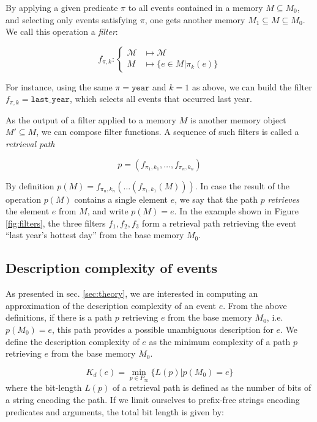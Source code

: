 \documentclass[entropy,article,submit,moreauthors,pdftex]{Definitions/mdpi}
\begin{document}
By applying a given predicate $\pi$ to all events contained in a memory $M \subseteq M_0$, and selecting only events satisfying $\pi$, one gets another memory $M_1 \subseteq M \subseteq M_0$. We call this operation a \emph{filter}:

\begin{equation}
    \label{eq:filter}
    f_{\pi, k}: \begin{cases}
        \mathcal{M} & \mapsto \mathcal{M}           \\
        M           & \mapsto \{e \in M | \pi_k(e) \}
    \end{cases}
\end{equation}

For instance, using the same $\pi = \mathtt{year}$ and $k=1$ as above, we can
build the filter $f_{\pi, k} = \mathtt{last\_{}year}$, which selects all events
that occurred last year.

As the output of a filter applied to a memory $M$ is another memory
object $M' \subseteq M$, we can compose filter
functions. A sequence of such filters is called a \emph{retrieval path}

\begin{equation}
    \label{eq:ret_def}
    p = (f_{\pi_{1}, k_{1}}, \dots, f_{\pi_{n}, k_{n}})
\end{equation}

By definition
$p(M) = f_{\pi_{n}, k_{n}}(\dots(f_{\pi_{1}, k_{1}}(M)))$.
In case the result of the operation $p(M)$ contains a single element
$e$, we say that the path $p$ \emph{retrieves} the element $e$ from $M$, and write
$p(M) = e$. In the example shown in Figure \ref{fig:filters}, the three filters $f_1, f_2, f_3$ form a retrieval path retrieving the event ``last year's hottest day'' from the base memory $M_0$.

\subsection{Description complexity of events}

As presented in sec. \ref{sec:theory}, we are interested in computing an approximation of the description complexity of an event $e$. From the above definitions, if there is a path $p$ retrieving $e$ from the base memory $M_0$, i.e. $p(M_0) = e$, this path provides a possible unambiguous description for $e$. We define the description complexity of $e$ as the minimum complexity of a path $p$ retrieving $e$ from the base memory $M_0$.

\begin{equation}
    \label{eq:k_desc}
    K_d(e) = \min_{p \in P_\infty} \{L(p) | p(M_0) = e\}
\end{equation}
where the bit-length $L(p)$ of a retrieval path is defined as the number of bits of a string encoding the path. If we limit ourselves to prefix-free strings encoding predicates and arguments, the total bit length is given by:
\end{document}
